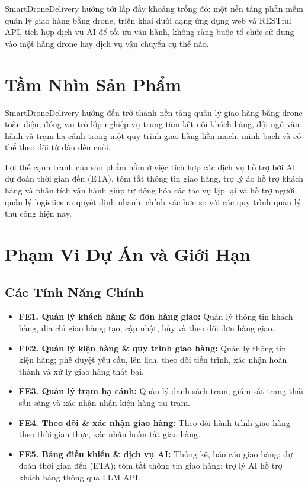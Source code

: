 SmartDroneDelivery hướng tới lấp đầy khoảng trống đó: một nền tảng phần mềm quản lý giao hàng bằng drone, triển khai dưới dạng ứng dụng web và RESTful API, tích hợp dịch vụ AI để tối ưu vận hành, không ràng buộc tổ chức sử dụng vào một hãng drone hay dịch vụ vận chuyển cụ thể nào.

\section{Tầm Nhìn Sản Phẩm}

SmartDroneDelivery hướng đến trở thành nền tảng quản lý giao hàng bằng drone toàn diện, đóng vai trò lớp nghiệp vụ trung tâm kết nối khách hàng, đội ngũ vận hành và trạm hạ cánh trong một quy trình giao hàng liền mạch, minh bạch và có thể theo dõi từ đầu đến cuối.

Lợi thế cạnh tranh của sản phẩm nằm ở việc tích hợp các dịch vụ hỗ trợ bởi AI dự đoán thời gian đến (ETA), tóm tắt thông tin giao hàng, trợ lý ảo hỗ trợ khách hàng và phân tích vận hành giúp tự động hóa các tác vụ lặp lại và hỗ trợ người quản lý logistics ra quyết định nhanh, chính xác hơn so với các quy trình quản lý thủ công hiện nay.

\section{Phạm Vi Dự Án và Giới Hạn}

\subsection{Các Tính Năng Chính}

\begin{itemize}
  \item \textbf{FE1. Quản lý khách hàng \& đơn hàng giao:} Quản lý thông tin khách hàng, địa chỉ giao hàng; tạo, cập nhật, hủy và theo dõi đơn hàng giao.
  \item \textbf{FE2. Quản lý kiện hàng \& quy trình giao hàng:} Quản lý thông tin kiện hàng; phê duyệt yêu cầu, lên lịch, theo dõi tiến trình, xác nhận hoàn thành và xử lý giao hàng thất bại.
  \item \textbf{FE3. Quản lý trạm hạ cánh:} Quản lý danh sách trạm, giám sát trạng thái sẵn sàng và xác nhận nhận kiện hàng tại trạm.
  \item \textbf{FE4. Theo dõi \& xác nhận giao hàng:} Theo dõi hành trình giao hàng theo thời gian thực, xác nhận hoàn tất giao hàng.
  \item \textbf{FE5. Bảng điều khiển \& dịch vụ AI:} Thống kê, báo cáo giao hàng; dự đoán thời gian đến (ETA); tóm tắt thông tin giao hàng; trợ lý AI hỗ trợ khách hàng thông qua LLM API.
\end{itemize}

